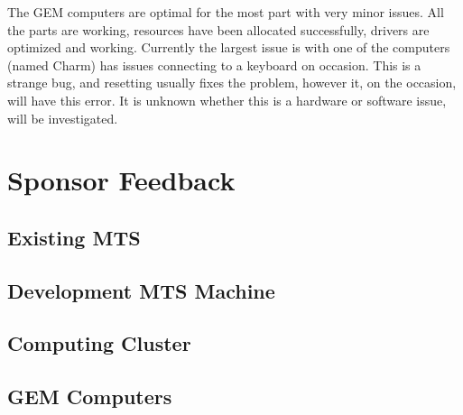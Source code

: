 \documentclass[12pt]{article}
\newcommand\tab[1][1cm]{\hspace*{#1}}
\begin{document}
\tab The GEM computers are optimal for the most part with very minor issues. All the parts are working, resources have been allocated successfully, drivers are optimized and working. Currently the largest issue is with one of the computers (named Charm) has issues connecting to a keyboard on occasion. This is a strange bug, and resetting usually fixes the problem, however it, on the occasion, will have this error. It is unknown whether this is a hardware or software issue, will be investigated. 

\section{Sponsor Feedback}

\subsection{Existing MTS}

\vspace{1in}

\subsection{Development MTS Machine}

\vspace{1in}

\subsection{Computing Cluster}

\vspace{1in}

\subsection{GEM Computers}

\vspace{1in}
\end{document}
